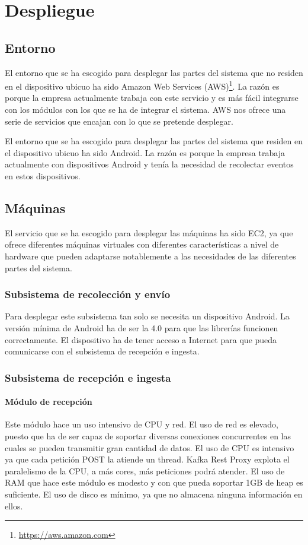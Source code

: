 \chapter{Despliegue} \label{cap:despligue}
\section{Entorno}
El entorno que se ha escogido para desplegar las partes del sistema que no residen en el dispositivo ubicuo ha sido Amazon Web Services (AWS)\footnote{\href{https://aws.amazon.com}{https://aws.amazon.com}}. La razón es porque la empresa actualmente trabaja con este servicio y es más fácil integrarse con los módulos con los que se ha de integrar el sistema. AWS nos ofrece una serie de servicios que encajan con lo que se pretende desplegar.

El entorno que se ha escogido para desplegar las partes del sistema que residen en el dispositivo ubicuo ha sido Android. La razón es porque la empresa trabaja actualmente con dispositivos Android y tenía la necesidad de recolectar eventos en estos dispositivos.

\section{Máquinas}
El servicio que se ha escogido para desplegar las máquinas ha sido EC2\cite{Tfg:ec2}, ya que ofrece diferentes máquinas virtuales con diferentes características a nivel de hardware que pueden adaptarse notablemente a las necesidades de las diferentes partes del sistema.

\subsection{Subsistema de recolección y envío}
Para desplegar este subsistema tan solo se necesita un dispositivo Android. La versión mínima de Android ha de ser la 4.0 para que las librerías funcionen correctamente. El dispositivo ha de tener acceso a Internet para que pueda comunicarse con el subsistema de recepción e ingesta.

\subsection{Subsistema de recepción e ingesta}
\subsubsection{Módulo de recepción}
Este módulo hace un uso intensivo de CPU y red\cite{Tfg:restproxykafka}. El uso de red es elevado, puesto que ha de ser capaz de soportar diversas conexiones concurrentes en las cuales se pueden transmitir gran cantidad de datos. El uso de CPU es intensivo ya que cada petición POST la atiende un thread. Kafka Rest Proxy explota el paralelismo de la CPU, a más cores, más peticiones podrá atender. El uso de RAM que hace este módulo es modesto y con que pueda soportar 1GB de heap es suficiente. El uso de disco es mínimo, ya que no almacena ninguna información en ellos.
\\

